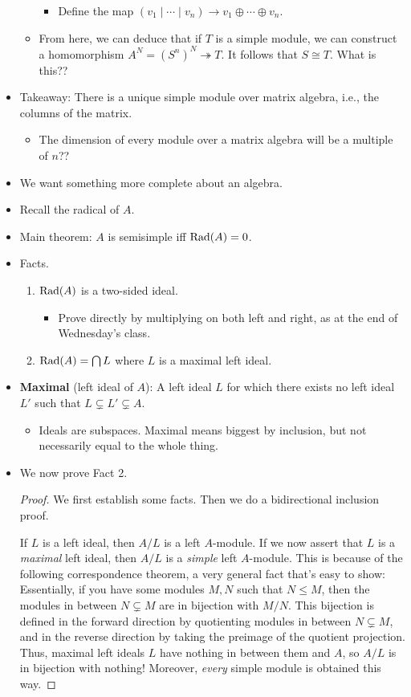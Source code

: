 \documentclass[../notes.tex]{subfiles}
\begin{document}
\begin{itemize}
\begin{itemize}
\begin{itemize}
            \item Define the map $(v_1\mid\cdots\mid v_n)\to v_1\oplus\cdots\oplus v_n$.
        \end{itemize}
        \item From here, we can deduce that if $T$ is a simple module, we can construct a homomorphism $A^N=(S^n)^N\twoheadrightarrow T$. It follows that $S\cong T$. What is this??
    \end{itemize}
    \item Takeaway: There is a unique simple module over matrix algebra, i.e., the columns of the matrix.
    \begin{itemize}
        \item The dimension of every module over a matrix algebra will be a multiple of $n$??
    \end{itemize}
    \item We want something more complete about an algebra.
    \item Recall the radical of $A$.
    \item Main theorem: $A$ is semisimple iff $\operatorname{Rad}(A)=0$.
    \item Facts.
    \begin{enumerate}
        \item $\operatorname{Rad}(A)$ is a two-sided ideal.
        \begin{itemize}
            \item Prove directly by multiplying on both left and right, as at the end of Wednesday's class.
        \end{itemize}
        \item $\operatorname{Rad}(A)=\bigcap L$ where $L$ is a maximal left ideal.
    \end{enumerate}
    \item \textbf{Maximal} (left ideal of $A$): A left ideal $L$ for which there exists no left ideal $L'$ such that $L\subsetneq L'\subsetneq A$.
    \begin{itemize}
        \item Ideals are subspaces. Maximal means biggest by inclusion, but not necessarily equal to the whole thing.
    \end{itemize}
    \item We now prove Fact 2.
    \begin{proof}
        We first establish some facts. Then we do a bidirectional inclusion proof.\par\smallskip
        If $L$ is a left ideal, then $A/L$ is a left $A$-module. If we now assert that $L$ is a \emph{maximal} left ideal, then $A/L$ is a \emph{simple} left $A$-module. This is because of the following correspondence theorem, a very general fact that's easy to show: Essentially, if you have some modules $M,N$ such that $N\leq M$, then the modules in between $N\subsetneq M$ are in bijection with $M/N$. This bijection is defined in the forward direction by quotienting modules in between $N\subsetneq M$, and in the reverse direction by taking the preimage of the quotient projection. Thus, maximal left ideals $L$ have nothing in between them and $A$, so $A/L$ is in bijection with nothing! Moreover, \emph{every} simple module is obtained this way.\par

\end{proof}
\end{itemize}
\end{document}
